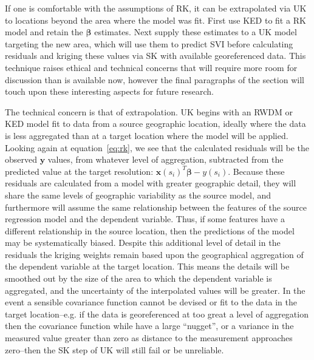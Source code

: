\documentclass[]{interact}
\theoremstyle{plain}%
\theoremstyle{definition}
\theoremstyle{remark}
\begin{document}
If one is comfortable with the assumptions of RK, it can be extrapolated via UK to locations beyond the area where the model was fit.  First use KED to fit a RK model and retain the $\bm{\beta}$ estimates.  Next supply these estimates to a UK model targeting the new area, which will use them to predict SVI before calculating residuals and kriging these values via SK with available georeferenced data.  This technique raises ethical and technical concerns that will require more room for discussion than is available now, however the final paragraphs of the section will touch upon these interesting aspects for future research.

The technical concern is that of extrapolation.  UK begins with an RWDM or KED model fit to data from a source geographic location, ideally where the data is less aggregated than at a target location where the model will be applied.  Looking again at equation~\ref{eq:rk}, we see that the calculated residuals will be the observed $\bm{y}$ values, from whatever level of aggregation, subtracted from the predicted value at the target resolution: $\bm{x}(s_i)^T \bm{\beta} - y(s_i)$.  Because these residuals are calculated from a model with greater geographic detail, they will share the same levels of geographic variability as the source model, and furthermore will assume the same relationship between the features of the source regression model and the dependent variable.  Thus, if some features have a different relationship in the source location, then the predictions of the model may be systematically biased.  Despite this additional level of detail in the residuals the kriging weights remain based upon the geographical aggregation of the dependent variable at the target location.  This means the details will be smoothed out by the size of the area to which the dependent variable is aggregated, and the uncertainty of the interpolated values will be greater.  In the event a sensible covariance function cannot be devised or fit to the data in the target location--e.g. if the data is georeferenced at too great a level of aggregation then the covariance function while have a large ``nugget'', or a variance in the measured value greater than zero as distance to the measurement approaches zero--then the SK step of UK will still fail or be unreliable.
\end{document}
